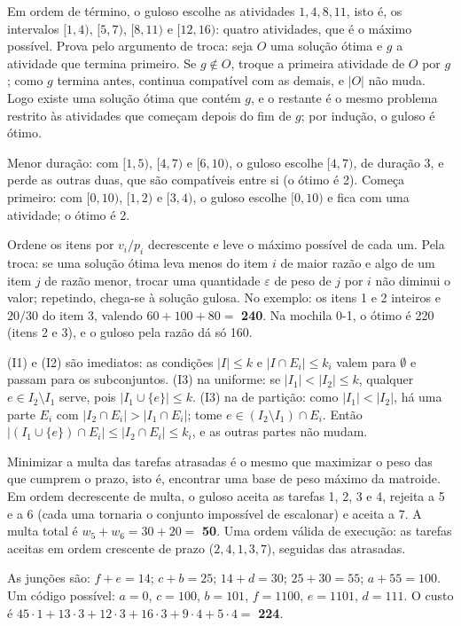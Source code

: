  Em ordem de término, o guloso escolhe as atividades $1,4,8,11$, isto é, os intervalos $[1,4)$, $[5,7)$, $[8,11)$ e $[12,16)$: quatro atividades, que é o máximo possível. Prova pelo argumento de troca: seja $O$ uma solução ótima e $g$ a atividade que termina primeiro. Se $g\notin O$, troque a primeira atividade de $O$ por $g$; como $g$ termina antes, continua compatível com as demais, e $|O|$ não muda. Logo existe uma solução ótima que contém $g$, e o restante é o mesmo problema restrito às atividades que começam depois do fim de $g$; por indução, o guloso é ótimo.

 Menor duração: com $[1,5)$, $[4,7)$ e $[6,10)$, o guloso escolhe $[4,7)$, de duração 3, e perde as outras duas, que são compatíveis entre si (o ótimo é 2). Começa primeiro: com $[0,10)$, $[1,2)$ e $[3,4)$, o guloso escolhe $[0,10)$ e fica com uma atividade; o ótimo é 2.

 Ordene os itens por $v_i/p_i$ decrescente e leve o máximo possível de cada um. Pela troca: se uma solução ótima leva menos do item $i$ de maior razão e algo de um item $j$ de razão menor, trocar uma quantidade $\varepsilon$ de peso de $j$ por $i$ não diminui o valor; repetindo, chega-se à solução gulosa. No exemplo: os itens 1 e 2 inteiros e $20/30$ do item 3, valendo $60+100+80=$ \textbf{240}. Na mochila 0-1, o ótimo é 220 (itens 2 e 3), e o guloso pela razão dá só 160.

 (I1) e (I2) são imediatos: as condições $|I|\le k$ e $|I\cap E_i|\le k_i$ valem para $\emptyset$ e passam para os subconjuntos. (I3) na uniforme: se $|I_1|<|I_2|\le k$, qualquer $e\in I_2\setminus I_1$ serve, pois $|I_1\cup\{e\}|\le k$. (I3) na de partição: como $|I_1|<|I_2|$, há uma parte $E_i$ com $|I_2\cap E_i|>|I_1\cap E_i|$; tome $e\in(I_2\setminus I_1)\cap E_i$. Então $|(I_1\cup\{e\})\cap E_i|\le|I_2\cap E_i|\le k_i$, e as outras partes não mudam.

 Minimizar a multa das tarefas atrasadas é o mesmo que maximizar o peso das que cumprem o prazo, isto é, encontrar uma base de peso máximo da matroide. Em ordem decrescente de multa, o guloso aceita as tarefas 1, 2, 3 e 4, rejeita a 5 e a 6 (cada uma tornaria o conjunto impossível de escalonar) e aceita a 7. A multa total é $w_5+w_6=30+20=$ \textbf{50}. Uma ordem válida de execução: as tarefas aceitas em ordem crescente de prazo ($2,4,1,3,7$), seguidas das atrasadas.

 As junções são: $f+e=14$; $c+b=25$; $14+d=30$; $25+30=55$; $a+55=100$. Um código possível: $a=0$, $c=100$, $b=101$, $f=1100$, $e=1101$, $d=111$. O custo é $45\cdot1+13\cdot3+12\cdot3+16\cdot3+9\cdot4+5\cdot4=$ \textbf{224}.

